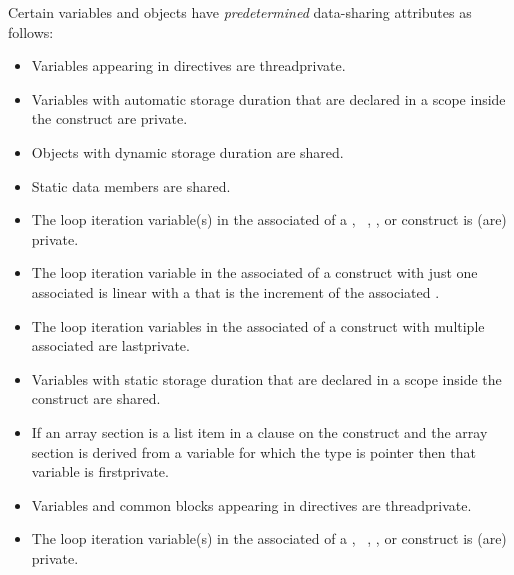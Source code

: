 {{{{Certain variables and objects have \emph{predetermined} data-sharing attributes as follows:

\ccppspecificstart
\begin{itemize}
\item Variables appearing in  directives are threadprivate.

\item Variables with automatic storage duration that are declared in a scope inside the 
construct are private. 

\item Objects with dynamic storage duration are shared.

\item Static data members are shared.

\item The loop iteration variable(s) in the associated  of a
, ~, , or  construct is (are) private.

\item The loop iteration variable in the associated  of a  construct with just 
one associated  is linear with a  that is the increment of
the associated .

\item The loop iteration variables in the associated  of a  construct with 
multiple associated  are lastprivate. 

\pagebreak

\item Variables with static storage duration that are declared in a scope inside the construct 
are shared.

\item If an array section is a list item in a  clause on the  construct and the array section is derived from a variable for which the type is pointer then that variable is firstprivate. 
\end{itemize}
\ccppspecificend

\fortranspecificstart
\begin{itemize}
\item Variables and common blocks appearing in  directives are 
threadprivate. 

\item The loop iteration variable(s) in the associated  of a , ~,
, or  construct is (are) private.


\end{itemize}}}}}

